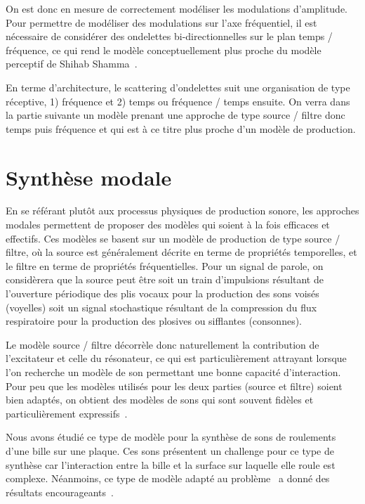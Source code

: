On est donc en mesure de correctement modéliser les modulations d'amplitude. Pour permettre de modéliser des modulations sur l'axe fréquentiel, il est nécessaire de considérer des ondelettes bi-directionnelles sur le plan temps / fréquence, ce qui rend le modèle conceptuellement plus proche du modèle perceptif de Shihab Shamma~\cite{8721532}.

En terme d'architecture, le scattering d'ondelettes suit une organisation de type réceptive, 1) fréquence et 2) temps ou fréquence / temps ensuite. On verra dans la partie suivante un modèle prenant une approche de type source / filtre donc temps puis fréquence  et qui est à ce titre plus proche d'un modèle de production.

\section{ \nmu Synthèse modale}

En se référant plutôt aux processus physiques de production sonore, les approches modales permettent de proposer des modèles qui soient à la fois efficaces et effectifs. Ces modèles se basent sur un modèle de production de type source / filtre, où la source est généralement décrite en terme de propriétés temporelles, et le filtre en terme de propriétés fréquentielles. Pour un signal de parole, on considèrera que la source peut être soit un train d'impulsions résultant de l'ouverture périodique des plis vocaux pour la production des sons voisés (voyelles) soit un signal stochastique résultant de la compression du flux respiratoire pour la production des plosives ou sifflantes (consonnes).


Le modèle source / filtre décorrèle donc naturellement la contribution de l'excitateur et celle du résonateur, ce qui est particulièrement attrayant lorsque l'on recherche un modèle de son permettant une bonne capacité d'interaction. Pour peu que les modèles utilisés pour les deux parties (source et filtre) soient bien adaptés, on obtient des modèles de sons qui sont souvent fidèles et particulièrement expressifs~\cite{aramaki2006analysis}.

Nous avons étudié ce type de modèle pour la synthèse de sons de roulements d'une bille sur une plaque. Ces sons présentent un challenge pour ce type de synthèse car l'interaction entre la bille et la surface sur laquelle elle roule est complexe. Néanmoins, ce type de modèle adapté au problème~\cite{LagrangeTasslp10} a donné des résultats encourageants~\cite{Murphy11a}.


